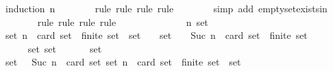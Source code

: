 \begin{isabellebody}
\ {\isacharparenleft}induction\ n{\isacharparenright}\isanewline
\ \ \ \ \ \ \isamarkupfalse%
\ {\isacharparenleft}rule{\isacharcomma}\ rule{\isacharcomma}\ rule{\isacharcomma}\ rule{\isacharparenright}\isanewline
\ \ \ \ \ \ \isamarkupfalse%
\ {\isacharparenleft}simp\ add{\isacharcolon}\ empty{\isacharunderscore}set{\isacharunderscore}exists{\isacharunderscore}in{\isacharunderscore}{\isasymSigma}{\isacharparenright}\isanewline
\ \ \ \ \ \ \isamarkupfalse%
\ {\isacharparenleft}rule{\isacharcomma}\ rule{\isacharcomma}\ rule{\isacharcomma}\ rule{\isacharparenright}\isanewline
\ \ \ \ \isamarkupfalse%
\ {\isacharminus}\isanewline
\ \ \ \ \ \ \isamarkupfalse%
\ n\ {\isasymsigma}{\isacharunderscore}set\isanewline
\ \ \ \ \ \ \isamarkupfalse%
\ {\isachardoublequoteopen}{\isasymforall}{\isasymsigma}{\isacharunderscore}set{\isasymsubseteq}{\isasymSigma}{\isachardot}\ n\ {\isacharequal}\ card\ {\isasymsigma}{\isacharunderscore}set\ {\isasymlongrightarrow}\ finite\ {\isasymsigma}{\isacharunderscore}set\ {\isasymlongrightarrow}\ {\isasymUnion}{\isasymsigma}{\isacharunderscore}set\ {\isasymin}\ {\isasymSigma}{\isachardoublequoteclose}\ \ {\isachardoublequoteopen}{\isasymsigma}{\isacharunderscore}set\ {\isasymsubseteq}\ {\isasymSigma}{\isachardoublequoteclose}\ \ {\isachardoublequoteopen}Suc\ n\ {\isacharequal}\ card\ {\isasymsigma}{\isacharunderscore}set{\isachardoublequoteclose}\ \ {\isachardoublequoteopen}finite\ {\isasymsigma}{\isacharunderscore}set{\isachardoublequoteclose}\ \isanewline
\ \ \ \ \ \ \isamarkupfalse%
\ \isamarkupfalse%
\ {\isachardoublequoteopen}{\isasymforall}\ {\isasymsigma}\ {\isasymin}\ {\isasymsigma}{\isacharunderscore}set{\isachardot}\ {\isasymsigma}{\isacharunderscore}set\ {\isacharminus}\ {\isacharbraceleft}{\isasymsigma}{\isacharbraceright}\ {\isasymsubseteq}\ {\isasymSigma}\ {\isasymand}\ {\isasymUnion}\ {\isacharparenleft}{\isasymsigma}{\isacharunderscore}set\ {\isacharminus}\ {\isacharbraceleft}{\isasymsigma}{\isacharbraceright}{\isacharparenright}\ {\isasymin}\ {\isasymSigma}{\isachardoublequoteclose}\isanewline
\ \ \ \ \ \ \ \ \isamarkupfalse%
\ {\isacartoucheopen}{\isasymsigma}{\isacharunderscore}set\ {\isasymsubseteq}\ {\isasymSigma}{\isacartoucheclose}\ {\isacartoucheopen}Suc\ n\ {\isacharequal}\ card\ {\isasymsigma}{\isacharunderscore}set{\isacartoucheclose}\ {\isacartoucheopen}{\isasymforall}{\isasymsigma}{\isacharunderscore}set{\isasymsubseteq}{\isasymSigma}{\isachardot}\ n\ {\isacharequal}\ card\ {\isasymsigma}{\isacharunderscore}set\ {\isasymlongrightarrow}\ finite\ {\isasymsigma}{\isacharunderscore}set\ {\isasymlongrightarrow}\ {\isasymUnion}{\isasymsigma}{\isacharunderscore}set\ {\isasymin}\ {\isasymSigma}{\isacartoucheclose}\isanewline

\end{isabellebody}
